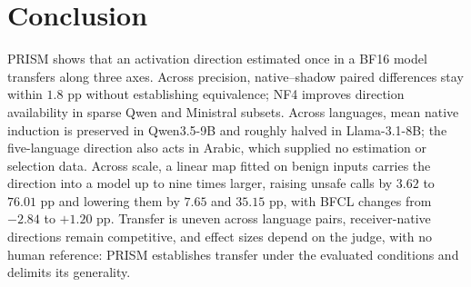 \section{Conclusion}
\label{sec:conclusion}
PRISM shows that an activation direction estimated once in a BF16
model transfers along three axes. Across precision, native--shadow paired differences stay within
$1.8$ pp without establishing equivalence; NF4 improves direction
availability in sparse Qwen and Ministral subsets.
Across languages, mean native induction is preserved in Qwen3.5-9B
and roughly halved in Llama-3.1-8B; the five-language direction also
acts in Arabic, which supplied no estimation or selection data. Across scale, a
linear map fitted on benign inputs carries the direction into a
model up to nine times larger, raising unsafe calls by $3.62$ to $76.01$ pp
and lowering them by $7.65$ and $35.15$ pp, with BFCL changes from
$-2.84$ to $+1.20$ pp. Transfer is uneven across language pairs,
receiver-native directions remain competitive, and effect sizes depend
on the judge, with no human reference: PRISM establishes transfer under
the evaluated conditions and delimits its generality.
\label{sec:conclusion-end}
